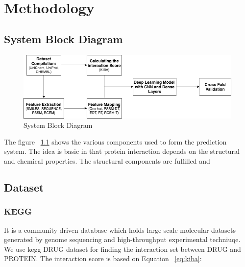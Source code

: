 \chapter{Methodology}

\section{System Block Diagram}

\begin{figure}[ht]
\centering
\includegraphics[width=1\linewidth]{mainmatter/3-Methodology/images/block.png}
\caption{System Block Diagram}
\label{fig:system}
\end{figure}

The figure ~\ref{fig:system}
shows the various components used to form the prediction system. The idea is basic in that protein interaction depends on the structural and chemical properties. The structural components are fulfilled and


\section{Dataset}

\subsection{KEGG}
It is a community-driven database which holds large-scale molecular datasets generated by genome sequencing and high-throughput experimental techniuqe.\cite{Kanehisa2000} We use \acrshort{kegg} DRUG dataset for finding the interaction set between DRUG and PROTEIN. The interaction score is based on Equation ~\ref{eq:kiba}:

